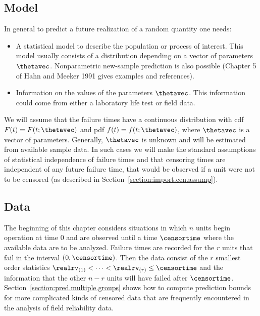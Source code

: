 \subsection{Model}
In general to predict a future realization of a random quantity one
needs:
\begin{itemize} 	 
\item
A statistical model to describe the population or process of interest.
This model usually consists of a distribution depending on a vector 
of parameters $\thetavec$.
Nonparametric new-sample prediction is also possible (Chapter 5 of Hahn
and Meeker 1991 gives examples and references).
\item
Information on the values of the parameters $\thetavec$.  This
information could come from either a laboratory life test or field
data.
\end{itemize} 
We will assume that the failure times have a continuous distribution
with cdf $F(t)=F(t; \thetavec)$ and pdf $f(t)=f(t; \thetavec)$, where
$\thetavec$ is a vector of parameters. Generally, $\thetavec$ is
unknown and will be estimated from available sample data.  In such
cases we will make the standard assumptions of statistical
independence of failure times and that censoring times are independent
of any future failure time, that would be observed if a unit were not
to be censored (as described in Section~\ref{section:import.cen.assump}).

\subsection{Data}
The beginning of this chapter considers situations in which
$n$ units begin operation at time 0 and are observed
until a time $\censortime$ where the available data are to be analyzed. 
Failure times are recorded for the $r$ units
that fail in the interval $(0, \censortime)$. Then the data consist
of the $r$ smallest order statistics $\realrv_{(1)}< \cdots <
\realrv_{(r)} \le \censortime$ and the information that 
the other $n-r$ units will have failed after $\censortime$.
Section~\ref{section:pred.multiple.groups} shows how to compute
prediction bounds for more complicated kinds of censored data that are
frequently encountered in the analysis of field reliability data.

